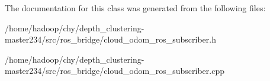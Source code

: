 The documentation for this class was generated from the following files\-:\begin{DoxyCompactItemize}
\item 
/home/hadoop/chy/depth\-\_\-clustering-\/master234/src/ros\-\_\-bridge/cloud\-\_\-odom\-\_\-ros\-\_\-subscriber.\-h\item 
/home/hadoop/chy/depth\-\_\-clustering-\/master234/src/ros\-\_\-bridge/cloud\-\_\-odom\-\_\-ros\-\_\-subscriber.\-cpp\end{DoxyCompactItemize}
